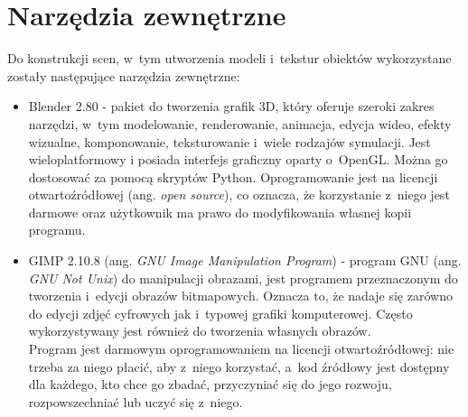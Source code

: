 \documentclass[a4paper,twoside,12pt]{book}
\newcommand{\obcy}[1]{\emph{#1}}
\newcommand{\ang}[1]{{\selectlanguage{british}\obcy{#1}}}
\begin{document}
\section{Narzędzia zewnętrzne}
Do konstrukcji scen, w~tym utworzenia modeli i~tekstur obiektów wykorzystane zostały następujące narzędzia zewnętrzne:
\begin{itemize}
    \item Blender 2.80 - pakiet do tworzenia grafik 3D, który oferuje szeroki zakres narzędzi, w~tym modelowanie, renderowanie, animacja, edycja wideo, efekty wizualne, komponowanie, teksturowanie i~wiele rodzajów symulacji. Jest wieloplatformowy i posiada interfejs graficzny oparty o~OpenGL. Można go dostosować za pomocą skryptów Python. Oprogramowanie jest na licencji otwartoźródłowej (ang. \ang{open source}), co oznacza, że korzystanie z~niego jest darmowe oraz użytkownik ma prawo do modyfikowania własnej kopii programu. \cite{bib:blender}
    \item GIMP 2.10.8 (ang. \ang{GNU Image Manipulation Program}) - program GNU (ang. \ang{GNU Not Unix}) do manipulacji obrazami, jest programem przeznaczonym do tworzenia i~edycji obrazów bitmapowych. Oznacza to, że nadaje się zarówno do edycji zdjęć cyfrowych jak i~typowej grafiki komputerowej. Często wykorzystywany jest również do tworzenia własnych obrazów. \\
    Program jest darmowym oprogramowaniem na licencji otwartoźródłowej: nie trzeba za niego płacić, aby z~niego korzystać, a~kod źródłowy jest dostępny dla każdego, kto chce go zbadać, przyczyniać się do jego rozwoju, rozpowszechniać lub uczyć się z~niego. \cite{bib:gimp}
\end{itemize}

\vbox{}
\end{document}
